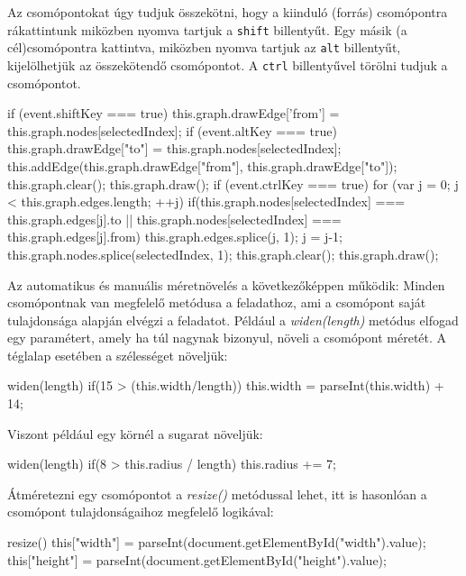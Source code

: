 Az csomópontokat úgy tudjuk összekötni, hogy a kiinduló (forrás) csomópontra rákattintunk miközben nyomva tartjuk a \texttt{shift} billentyűt. Egy másik (a cél)csomópontra kattintva, miközben nyomva tartjuk az \texttt{alt} billentyűt, kijelölhetjük az összekötendő csomópontot. A \texttt{ctrl} billentyűvel törölni tudjuk a csomópontot.

\begin{javascript}
if (event.shiftKey === true) {
   this.graph.drawEdge['from'] = this.graph.nodes[selectedIndex];
}
if (event.altKey === true) {
   this.graph.drawEdge["to"] = this.graph.nodes[selectedIndex];
   this.addEdge(this.graph.drawEdge["from"], this.graph.drawEdge["to"]);
   this.graph.clear();
   this.graph.draw();
}
if (event.ctrlKey === true) {
   for (var j = 0; j < this.graph.edges.length; ++j) {
       if(this.graph.nodes[selectedIndex] === this.graph.edges[j].to || this.graph.nodes[selectedIndex] === this.graph.edges[j].from)
       {
           this.graph.edges.splice(j, 1);
           j = j-1;
       }
   }
   this.graph.nodes.splice(selectedIndex, 1);
   this.graph.clear();
   this.graph.draw();
}
\end{javascript}

Az automatikus és manuális méretnövelés a következőképpen működik: Minden csomópontnak van megfelelő metódusa a feladathoz, ami a csomópont saját tulajdonsága alapján elvégzi a feladatot. Például a \textit{widen(length)} metódus elfogad egy paramétert, amely ha túl nagynak bizonyul, növeli a csomópont méretét. A téglalap esetében a szélességet növeljük:

\begin{javascript}
widen(length){
   if(15 > (this.width/length))
   {
       this.width = parseInt(this.width) + 14;
   }
}
\end{javascript}

Viszont például egy körnél a sugarat növeljük:

\begin{javascript}
widen(length){
   if(8 > this.radius / length)
   {
       this.radius += 7;
   }
}
\end{javascript}

Átméretezni egy csomópontot a \textit{resize()} metódussal lehet, itt is hasonlóan a csomópont tulajdonságaihoz megfelelő logikával:

\begin{javascript}
resize(){
   this["width"] = parseInt(document.getElementById("width").value);
   this["height"] =  parseInt(document.getElementById("height").value);
}
\end{javascript}

